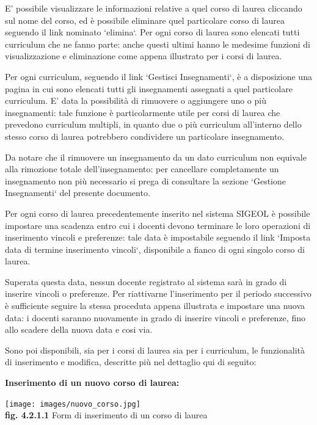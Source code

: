 \documentclass[11pt,a4paper]{article}
\begin{document}
E' possibile visualizzare le informazioni relative a quel corso di laurea cliccando sul nome del corso, ed è possibile eliminare quel particolare corso di laurea seguendo il link nominato `elimina`.
Per ogni corso di laurea sono elencati tutti curriculum che ne fanno parte: anche questi ultimi hanno le medesime funzioni di visualizzazione e eliminazione come appena illustrato per i corsi di laurea.

Per ogni curriculum, seguendo il link `Gestisci Insegnamenti`, è a disposizione una pagina in cui sono elencati tutti gli insegnamenti assegnati a quel particolare curriculum. E' data la possibilità di rimuovere o aggiungere uno o più insegnamenti: tale funzione è particolarmente utile per corsi di laurea che prevedono curriculum multipli, in quanto due o più curriculum all'interno dello stesso corso di laurea potrebbero condividere un particolare insegnamento.

Da notare che il rimuovere un insegnamento da un dato curriculum non equivale alla rimozione totale dell'insegnamento: per cancellare completamente un insegnamento non più necessario si prega di consultare la sezione `Gestione Insegnamenti` del presente documento.

\bigskip
Per ogni corso di laurea precedentemente inserito nel sistema SIGEOL è possibile impostare una scadenza entro cui i docenti devono terminare le loro operazioni di inserimento vincoli e preferenze: tale data è impostabile seguendo il link `Imposta data di termine inserimento vincoli`, disponibile a fianco di ogni singolo corso di laurea.

Superata questa data, nessun docente registrato al sistema sarà in grado di inserire vincoli o preferenze. Per riattivarne l'inserimento per il periodo successivo è sufficiente seguire la stessa proceduta appena illustrata e impostare una nuova data: i docenti saranno nuovamente in grado di inserire vincoli e preferenze, fino allo scadere della nuova data e cosi via.

Sono poi disponibili, sia per i corsi di laurea sia per i curriculum, le funzionalità di inserimento e modifica, descritte più nel dettaglio qui di seguito:
\newpage
\begin{large}\textbf{Inserimento di un nuovo corso di laurea:}\end{large}

\begin{center}
	\texttt{[image: images/nuovo\_corso.jpg]}\\
	\textbf{fig. 4.2.1.1} Form di inserimento di un corso di laurea\\
\end{center}
\end{document}
